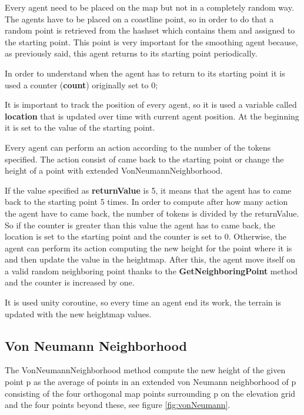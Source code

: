 \documentclass[12pt]{article}
\begin{document}
    Every agent need to be placed on the map but not in a completely random way. The agents have to be placed on a coastline point, so in order to do that a random point is retrieved
    from the hashset which contains them and assigned to the starting point. This point is very important for the smoothing agent because, as previously said, this agent returns
    to its starting point periodically.

    In order to understand when the agent has to return to its starting point it is used a counter (\textbf{count}) originally set to 0;
    
    It is important to track the position of every agent, so it is used a variable called \textbf{location} that is updated over time with current agent position. 
    At the beginning it is set to the value of the starting point.

    Every agent can perform an action according to the number of the tokens specified. The action consist of came back to the starting point or change the height of a point
    with extended VonNeumannNeighborhood.

    If the value specified as \textbf{returnValue} is 5, it means that the agent has to came back to the starting point 5 times. In order to compute after how many action the agent
    have to came back, the number of tokens is divided by the returnValue. So if the counter is greater than this value the agent has to came back, the location is set to the
    starting point and the counter is set to 0. Otherwise, the agent can perform its action computing the new height for the point where it is and then update the value in the heightmap.
    After this, the agent move itself on a valid random neighboring point thanks to the \textbf{GetNeighboringPoint} method and the counter is increased by one.

    It is used unity coroutine, so every time an agent end its work, the terrain is updated with the new heightmap values.

    \subsection{Von Neumann Neighborhood} \label{section:Von Neumann}
    The VonNeumannNeighborhood method compute the new height of the given point p as the average of points in an extended von Neumann neighborhood of p consisting of the
    four orthogonal map points surrounding p on the elevation grid and the four points beyond these, see figure \ref{fig:vonNeumann}.
\end{document}
